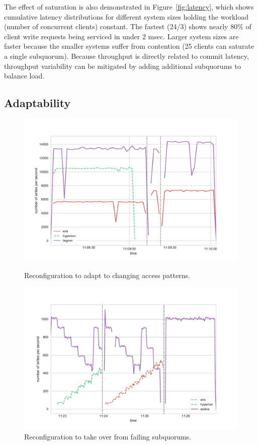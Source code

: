 \documentclass[10pt,conference]{IEEEtran}
\begin{document}
The effect of saturation is also demonstrated in Figure~\ref{fig:latency}, which shows
cumulative latency distributions for different system sizes holding the workload
(number of concurrent clients) constant.
The fastest (24/3) shows nearly 80\% of client write requests being serviced in under
2 msec.
Larger system sizes are faster because the smaller systems suffer from contention (25
clients can saturate a single subquorum).
Because throughput is directly related to commit latency, throughput variability can be
mitigated by adding additional subquorums to balance load.

\subsection{Adaptability}
\label{section:adaptability}

\begin{figure}[t]
    \centering
        \includegraphics[width=\linewidth]{figures/umd_fault_tolerance.pdf}
        \caption{Reconfiguration to adapt to changing access patterns.}
        \label{fig:fault_tolerance}
    \endminipage\hfill
        \includegraphics[width=\linewidth]{figures/umd_sawtooth.pdf}
        \caption{Reconfiguration to take over from failing subquorums.}
        \label{fig:sawtooth}
    \endminipage
\end{figure}
\end{document}
